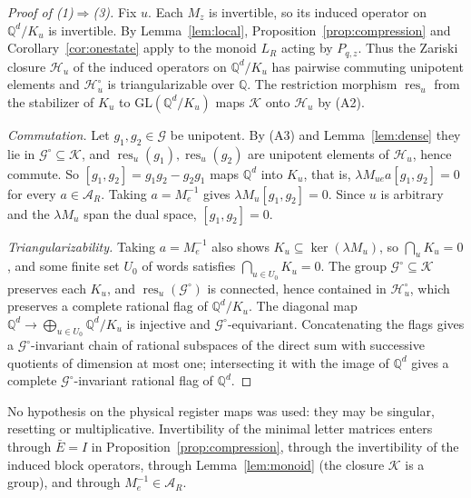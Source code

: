 \documentclass[acmlarge,screen,11pt,nonacm,natbib=false]{acmart}
\newcommand{\Q}{\mathbb{Q}}
\newcommand{\cG}{\mathcal{G}}
\newcommand{\cK}{\mathcal{K}}
\newcommand{\cH}{\mathcal{H}}
\newcommand{\cA}{\mathcal{A}}
\newcommand{\GL}{\mathrm{GL}}
\newcommand{\res}{\operatorname{res}}
\theoremstyle{definition}
\begin{document}
\begin{proof}[Proof of (1)$\Rightarrow$(3)]
Fix $u$. Each $M_z$ is invertible, so its induced operator on $\Q^d/K_u$ is invertible. By Lemma~\ref{lem:local}, Proposition~\ref{prop:compression} and Corollary~\ref{cor:onestate} apply to the monoid $L_R$ acting by $P_{q,z}$. Thus the Zariski closure $\cH_u$ of the induced operators on $\Q^d/K_u$ has pairwise commuting unipotent elements and $\cH_u^\circ$ is triangularizable over $\Q$. The restriction morphism $\res_u$ from the stabilizer of $K_u$ to $\GL(\Q^d/K_u)$ maps $\cK$ onto $\cH_u$ by (A2).

\emph{Commutation.} Let $g_1,g_2\in\cG$ be unipotent. By (A3) and Lemma~\ref{lem:dense} they lie in $\cG^\circ\subseteq\cK$, and $\res_u(g_1),\res_u(g_2)$ are unipotent elements of $\cH_u$, hence commute. So $[g_1,g_2]=g_1g_2-g_2g_1$ maps $\Q^d$ into $K_u$, that is, $\lambda M_{ue}a[g_1,g_2]=0$ for every $a\in\cA_R$. Taking $a=M_e^{-1}$ gives $\lambda M_u[g_1,g_2]=0$. Since $u$ is arbitrary and the $\lambda M_u$ span the dual space, $[g_1,g_2]=0$.

\emph{Triangularizability.} Taking $a=M_e^{-1}$ also shows $K_u\subseteq\ker(\lambda M_u)$, so $\bigcap_uK_u=0$, and some finite set $U_0$ of words satisfies $\bigcap_{u\in U_0}K_u=0$. The group $\cG^\circ\subseteq\cK$ preserves each $K_u$, and $\res_u(\cG^\circ)$ is connected, hence contained in $\cH_u^\circ$, which preserves a complete rational flag of $\Q^d/K_u$. The diagonal map $\Q^d\to\bigoplus_{u\in U_0}\Q^d/K_u$ is injective and $\cG^\circ$-equivariant. Concatenating the flags gives a $\cG^\circ$-invariant chain of rational subspaces of the direct sum with successive quotients of dimension at most one; intersecting it with the image of $\Q^d$ gives a complete $\cG^\circ$-invariant rational flag of $\Q^d$.
\end{proof}

No hypothesis on the physical register maps was used: they may be singular, resetting or multiplicative. Invertibility of the minimal letter matrices enters through $\bar E=I$ in Proposition~\ref{prop:compression}, through the invertibility of the induced block operators, through Lemma~\ref{lem:monoid} (the closure $\cK$ is a group), and through $M_e^{-1}\in\cA_R$.
\end{document}
